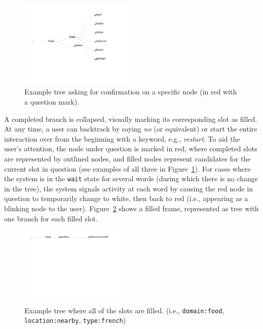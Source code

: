 \documentclass[11pt]{article}
\begin{document}
\begin{figure}[ht]
  \centering
      \includegraphics[width=0.5\textwidth]{figures/diatree-confirmation.pdf}	
      \caption{Example tree asking for confirmation on a specific node (in red with a question mark).\label{fig:confirm}}
\end{figure}

A completed branch is collapsed, visually marking its corresponding slot as filled. At any time, a user can backtrack by saying \emph{no} (or equivalent) or start the entire interaction over from the beginning with a keyword, e.g., \emph{restart}. To aid the user's attention, the node under question is marked in red, where completed slots are represented by outlined nodes, and filled nodes represent candidates for the current slot in question (see examples of all three in Figure~\ref{fig:confirm}). For cases where the system is in the \texttt{wait} state for several words (during which there is no change in the tree), the system signals activity at each word by causing the red node in question to temporarily change to white, then back to red (i.e., appearing as a blinking node to the user). Figure~\ref{fig:filled} shows a filled frame, represented as tree with one branch for each filled slot.

\begin{figure}[ht]
  \centering
      \includegraphics[width=0.45\textwidth]{figures/diatree-filled.pdf}	
      \caption{Example tree where all of the slots are filled. (i.e., \texttt{domain:food}, \texttt{location:nearby}, \texttt{type:french}) \label{fig:filled}}
\end{figure}
\end{document}
